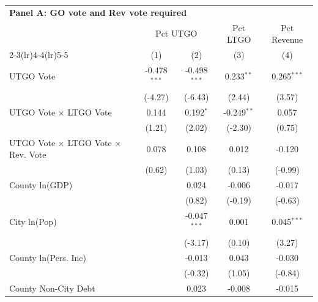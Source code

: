 \begingroup
\centering
\begin{tabular*}{\textwidth}{@{\extracolsep{\fill}}lcccc}
\multicolumn{5}{l}{\textbf{Panel A: GO vote and Rev vote required}}\\

\addlinespace
   \toprule
    & \multicolumn{2}{c}{Pct UTGO} & Pct LTGO & Pct Revenue\\
   \cmidrule(lr){2-3}\cmidrule(lr){4-4}\cmidrule(lr){5-5}
                                                     & (1)            & (2)            & (3)           & (4)\\  
   \midrule 
   UTGO Vote                                         & -0.478$^{***}$ & -0.498$^{***}$ & 0.233$^{**}$  & 0.265$^{***}$\\   
                                                     & (-4.27)       & (-6.43)       & (2.44)       & (3.57)\\   
   UTGO Vote $\times$ LTGO Vote                      & 0.144          & 0.192$^{*}$    & -0.249$^{**}$ & 0.057\\   
                                                     & (1.21)        & (2.02)        & (-2.30)      & (0.75)\\   
   UTGO Vote $\times$ LTGO Vote $\times$ Rev. Vote   & 0.078          & 0.108          & 0.012         & -0.120\\   
                                                     & (0.62)        & (1.03)        & (0.13)       & (-0.99)\\   
   County ln(GDP)                                    &                & 0.024          & -0.006        & -0.017\\   
                                                     &                & (0.82)        & (-0.19)      & (-0.63)\\   
   City ln(Pop)                                      &                & -0.047$^{***}$ & 0.001         & 0.045$^{***}$\\   
                                                     &                & (-3.17)       & (0.10)       & (3.27)\\   
   County ln(Pers. Inc)                              &                & -0.013         & 0.043         & -0.030\\   
                                                     &                & (-0.32)       & (1.05)       & (-0.84)\\   
   County Non-City Debt                              &                & 0.023          & -0.008        & -0.015\\   

\end{tabular*}
